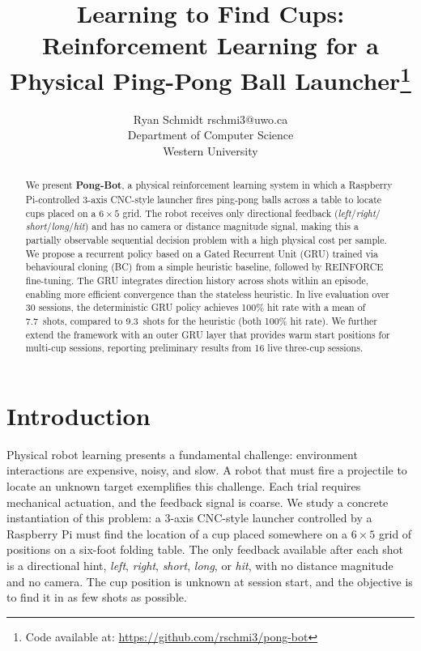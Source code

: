 \documentclass[twoside,11pt]{article}
\title{Learning to Find Cups: Reinforcement Learning for a Physical
Ping-Pong Ball Launcher\thanks{Code available at: \url{https://github.com/rschmi3/pong-bot}}}
\author{
  \name Ryan Schmidt \email rschmi3@uwo.ca \\
  \addr Department of Computer Science \\
  Western University
}
\begin{document}
\maketitle

\begin{abstract}
We present \textbf{Pong-Bot}, a physical reinforcement learning system in which
  a Raspberry Pi-controlled 3-axis CNC-style launcher fires ping-pong balls
  across a table to locate cups placed on a $6\times5$ grid. The robot receives
  only directional feedback (\textit{left}/\textit{right}/
  \textit{short}/\textit{long}/\textit{hit}) and has no camera or distance
  magnitude signal, making this a partially observable sequential decision
  problem with a high physical cost per sample. We propose a recurrent policy
  based on a Gated Recurrent Unit (GRU) trained via behavioural cloning (BC)
  from a simple heuristic baseline, followed by REINFORCE fine-tuning. The GRU
  integrates direction history across shots within an episode, enabling more
  efficient convergence than the stateless heuristic. In live evaluation over
  30 sessions, the deterministic GRU policy achieves 100\% hit rate with a mean
  of 7.7~shots, compared to 9.3~shots for the heuristic (both 100\% hit rate).
  We further extend the framework with an outer GRU layer that provides warm
  start positions for multi-cup sessions, reporting preliminary results from 16
  live three-cup sessions.
\end{abstract}

\section{Introduction}

Physical robot learning presents a fundamental challenge: environment
interactions are expensive, noisy, and slow. A robot that must fire a
projectile to locate an unknown target exemplifies this challenge. Each trial
requires mechanical actuation, and the feedback signal is coarse. We study a
concrete instantiation of this problem: a 3-axis CNC-style launcher controlled
by a Raspberry Pi must find the location of a cup placed somewhere on a
$6\times5$ grid of positions on a six-foot folding table. The only feedback
available after each shot is a directional hint, \textit{left},
\textit{right}, \textit{short}, \textit{long}, or \textit{hit}, with no
distance magnitude and no camera. The cup position is unknown at session start,
and the objective is to find it in as few shots as possible.
\end{document}
